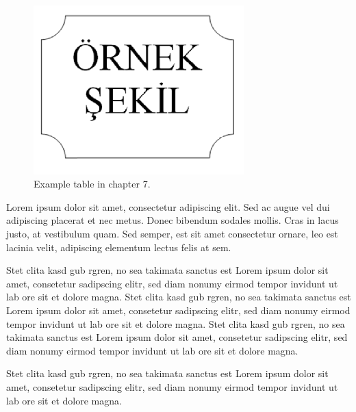 \begin{figure}
	\centering
	\includegraphics[width=230pt,keepaspectratio=true]{./fig/sekil7}
	\caption{Example table in chapter 7.}
	\label{Figure7.1}
\end{figure}

Lorem ipsum dolor sit amet, consectetur adipiscing elit. Sed ac augue vel dui adipiscing placerat et nec metus. Donec bibendum sodales mollis. Cras in lacus justo, at vestibulum quam. Sed semper, est sit amet consectetur ornare, leo est lacinia velit, adipiscing elementum lectus felis at sem.

Stet clita kasd gub rgren, no sea takimata sanctus est Lorem ipsum dolor sit amet, consetetur sadipscing elitr, sed diam nonumy eirmod tempor invidunt ut lab ore sit et dolore magna. Stet clita kasd gub rgren, no sea takimata sanctus est Lorem ipsum dolor sit amet, consetetur sadipscing elitr, sed diam nonumy eirmod tempor invidunt ut lab ore sit et dolore magna. Stet clita kasd gub rgren, no sea takimata sanctus est Lorem ipsum dolor sit amet, consetetur sadipscing elitr, sed diam nonumy eirmod tempor invidunt ut lab ore sit et dolore magna. 

Stet clita kasd gub rgren, no sea takimata sanctus est Lorem ipsum dolor sit amet, consetetur sadipscing elitr, sed diam nonumy eirmod tempor invidunt ut lab ore sit et dolore magna. 



